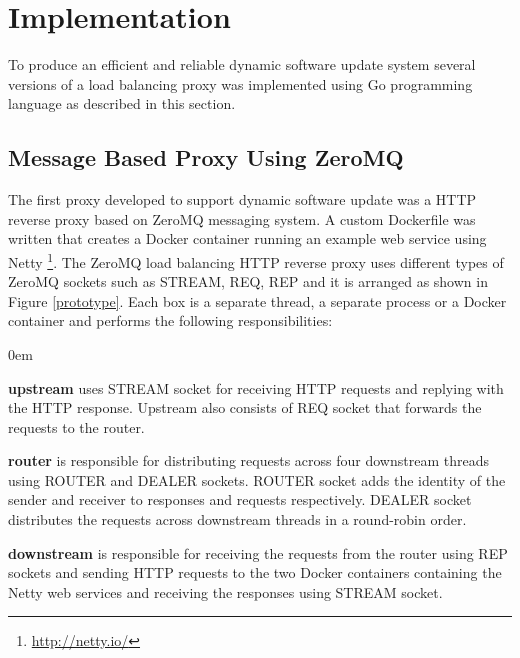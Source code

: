 \documentclass[a4paper,11pt,twoside]{article}
\begin{document}
\clearpage
\section{Implementation} \label{Implementation}
To produce an efficient and reliable dynamic software update system several versions of a load balancing proxy was implemented using Go programming language as described in this section. 

\subsection{Message Based Proxy Using ZeroMQ}
The first proxy developed to support dynamic software update was a HTTP reverse proxy based on ZeroMQ messaging system. A custom Dockerfile was written that creates a Docker container running an example web service using Netty \footnote{\url{http://netty.io/}}. The ZeroMQ load balancing HTTP reverse proxy uses different types of ZeroMQ sockets such as STREAM, REQ, REP and it is arranged as shown in Figure \ref{prototype}. Each box is a separate thread, a separate process or a Docker container and performs the following responsibilities:
 
\begin{list}{-}{}
  \itemsep0em
  \item \textbf{upstream} uses STREAM socket for receiving HTTP requests and replying with the HTTP response. Upstream also consists of REQ socket that forwards the requests to the router. 
  
  \item \textbf{router} is responsible for distributing requests across four downstream threads using ROUTER and DEALER sockets. ROUTER socket adds the identity of the sender and receiver to responses and requests respectively. DEALER socket distributes the requests across downstream threads in a round-robin order.
 
  \item \textbf{downstream} is responsible for receiving the requests from the router using REP sockets and sending HTTP requests to the two Docker containers containing the Netty web services and receiving the responses using STREAM socket.
\end{list}
\end{document}
